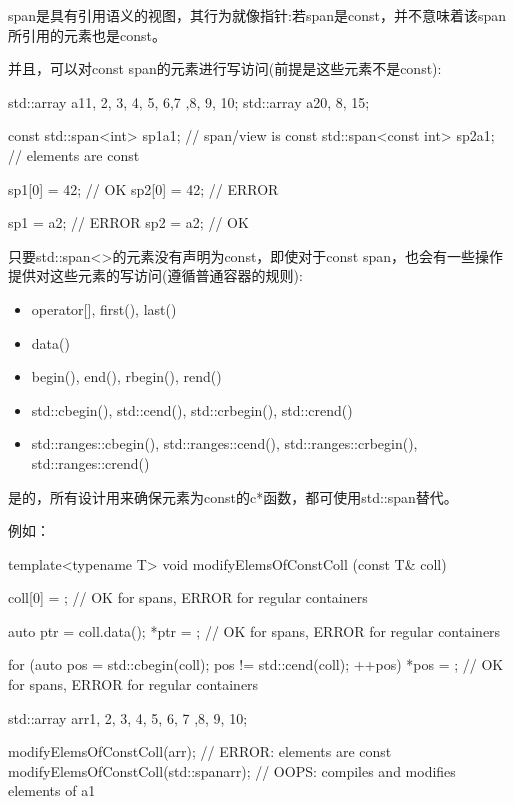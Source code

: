 span是具有引用语义的视图，其行为就像指针:若span是const，并不意味着该span所引用的元素也是const。

并且，可以对const span的元素进行写访问(前提是这些元素不是const):

\begin{cpp}
std::array a1{1, 2, 3, 4, 5, 6,7 ,8, 9, 10};
std::array a2{0, 8, 15};

const std::span<int> sp1{a1}; // span/view is const
std::span<const int> sp2{a1}; // elements are const

sp1[0] = 42; // OK
sp2[0] = 42; // ERROR

sp1 = a2; // ERROR
sp2 = a2; // OK
\end{cpp}

只要std::span<>的元素没有声明为const，即使对于const span，也会有一些操作提供对这些元素的写访问(遵循普通容器的规则):

\begin{itemize}
\item
operator[], first(), last()

\item
data()

\item
begin(), end(), rbegin(), rend()

\item
std::cbegin(), std::cend(), std::crbegin(), std::crend()

\item
std::ranges::cbegin(), std::ranges::cend(), std::ranges::crbegin(), std::ranges::crend()
\end{itemize}

是的，所有设计用来确保元素为const的c*函数，都可使用std::span替代。

例如：

\begin{cpp}
template<typename T>
void modifyElemsOfConstColl (const T& coll)
{
	coll[0] = {}; // OK for spans, ERROR for regular containers

	auto ptr = coll.data();
	*ptr = {}; // OK for spans, ERROR for regular containers

	for (auto pos = std::cbegin(coll); pos != std::cend(coll); ++pos) {
		*pos = {}; // OK for spans, ERROR for regular containers
	}
}

std::array arr{1, 2, 3, 4, 5, 6, 7 ,8, 9, 10};

modifyElemsOfConstColl(arr); // ERROR: elements are const
modifyElemsOfConstColl(std::span{arr}); // OOPS: compiles and modifies elements of a1
\end{cpp}

